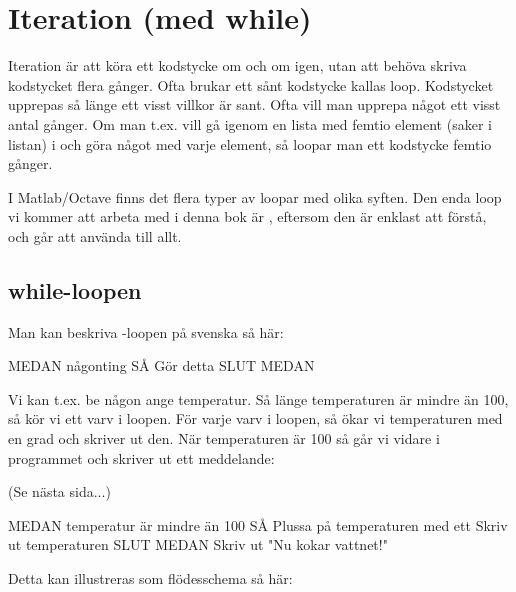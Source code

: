 %
%
\chapter{Iteration (med while)}\label{ch:iteration}
Iteration är att köra ett kodstycke om och om igen, utan att behöva skriva kodstycket flera gånger. Ofta brukar ett sånt kodstycke kallas loop. Kodstycket upprepas så länge ett visst villkor är sant. Ofta vill man upprepa något ett visst antal gånger. Om man t.ex. vill gå igenom en lista med femtio element (saker i listan) i och göra något med varje element, så loopar man ett kodstycke femtio gånger.

I Matlab/Octave finns det flera typer av loopar med olika syften. Den enda loop vi kommer att arbeta med i denna bok är , eftersom den är enklast att förstå, och går att använda till allt.

\section{while-loopen}
Man kan beskriva -loopen på svenska så här:

\begin{pseudo}
MEDAN någonting SÅ
   Gör detta
SLUT MEDAN
\end{pseudo}

Vi kan t.ex. be någon ange temperatur. Så länge temperaturen är mindre än 100, så kör vi ett varv i loopen. För varje varv i loopen, så ökar vi temperaturen med en grad och skriver ut den. När temperaturen är 100 så går vi vidare i programmet och skriver ut ett meddelande:

(Se nästa sida...)
\newpage
\begin{pseudo}
MEDAN temperatur är mindre än 100 SÅ
   Plussa på temperaturen med ett
   Skriv ut temperaturen
SLUT MEDAN
Skriv ut "Nu kokar vattnet!"
\end{pseudo}

Detta kan illustreras som flödesschema så här:


